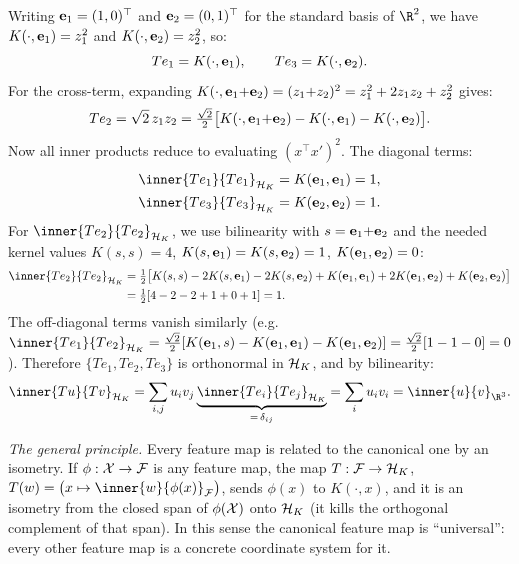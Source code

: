 \begin{notechapter}
\begin{intuition}
Writing $\mathbf{e}_1 = (1,0)^\top$ and
$\mathbf{e}_2 = (0,1)^\top$ for the standard basis of
$\R^2$, we have
$K(\cdot, \mathbf{e}_1) = z_1^2$ and
$K(\cdot, \mathbf{e}_2) = z_2^2$, so:
\[
Te_1 = K(\cdot, \mathbf{e}_1), \qquad
Te_3 = K(\cdot, \mathbf{e}_2).
\]
For the cross-term, expanding
$K(\cdot, \mathbf{e}_1{+}\mathbf{e}_2) = (z_1{+}z_2)^2
= z_1^2 + 2z_1 z_2 + z_2^2$ gives:
\[
Te_2 = \sqrt{2}\,z_1 z_2
= \tfrac{\sqrt{2}}{2}\bigl[
K(\cdot, \mathbf{e}_1{+}\mathbf{e}_2)
- K(\cdot, \mathbf{e}_1) - K(\cdot, \mathbf{e}_2)\bigr].
\]
Now all inner products reduce to evaluating
$(x^\top x')^2$. The diagonal terms:
\begin{align*}
\inner{Te_1}{Te_1}_{\hk}
&= K(\mat{e}_1, \mat{e}_1) = 1, \\
\inner{Te_3}{Te_3}_{\hk}
&= K(\mat{e}_2, \mat{e}_2) = 1.
\end{align*}
For $\inner{Te_2}{Te_2}_{\hk}$, we use bilinearity
with $s = \mathbf{e}_1{+}\mathbf{e}_2$ and the needed
kernel values $K(s,s) = 4$,
$K(s,\mathbf{e}_1) = K(s,\mathbf{e}_2) = 1$,
$K(\mathbf{e}_1,\mathbf{e}_2) = 0$:
\begin{align*}
\inner{Te_2}{Te_2}_{\hk}
&= \tfrac{1}{2}\bigl[
  K(s,s) - 2K(s,\mat{e}_1) - 2K(s,\mat{e}_2)
  + K(\mat{e}_1,\mat{e}_1)
  + 2K(\mat{e}_1,\mat{e}_2)
  + K(\mat{e}_2,\mat{e}_2)
\bigr] \\
&= \tfrac{1}{2}[4 - 2 - 2 + 1 + 0 + 1] = 1.
\end{align*}
The off-diagonal terms vanish similarly (e.g.\
$\inner{Te_1}{Te_2}_{\hk}
= \frac{\sqrt{2}}{2}[K(\mat{e}_1, s)
- K(\mat{e}_1, \mat{e}_1)
- K(\mat{e}_1, \mat{e}_2)]
= \frac{\sqrt{2}}{2}[1 - 1 - 0] = 0$).
Therefore $\{Te_1, Te_2, Te_3\}$ is orthonormal in
$\mathcal{H}_K$, and by bilinearity:
\[
\inner{Tu}{Tv}_{\hk}
= \sum_{i,j} u_i v_j
  \underbrace{\inner{Te_i}{Te_j}_{\hk}}_{%
    =\,\delta_{ij}}
= \sum_i u_i v_i
= \inner{u}{v}_{\R^3}.
\]
\end{intuition}

\begin{intuition}
\emph{The general principle.} Every feature map is related to the canonical one by an isometry. If $\phi: \mathcal{X} \to \mathcal F$ is any feature map, the map $T: \mathcal F \to \mathcal{H}_K$, $T(w) = \bigl(x \mapsto \inner{w}{\phi(x)}_{\mathcal F}\bigr)$, sends $\phi(x)$ to $K(\cdot, x)$, and it is an isometry from the closed span of $\phi(\mathcal{X})$ onto $\mathcal{H}_K$ (it kills the orthogonal complement of that span). In this sense the canonical feature map is ``universal'': every other feature map is a concrete coordinate system for it.


\end{intuition}
\end{notechapter}
